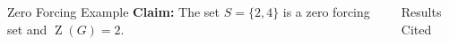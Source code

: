 \documentclass[final]{beamer}
\newcommand{\Z}{\operatorname{Z}}
\newcommand{\A}{\mathcal{A}}
\newcommand{\B}{\mathcal{B}}
\newcommand{\x}{\times}
\newcommand{\eit}{\end{itemize}}
\newcommand{\ben}{\begin{enumerate}}
\newcommand{\een}{\end{enumerate}}
\def\mtx#1{\begin{bmatrix} #1 \end{bmatrix}}
\begin{document}
\begin{frame}{}
\begin{columns}[t]
\begin{column}{0.23\linewidth}

\begin{block}{Zero Forcing Example}
\textbf{Claim:} The set $S = \{2,4\}$ is a zero forcing set and $\Z(G) = 2$.
\begin{figure}[h!]
\centering
{}
\end{figure}

\end{block}

\end{column}%

\begin{column}{0.38\linewidth}
 

\begin{block}{Results Cited}
     

\end{block}
\end{column}
\end{columns}
\end{frame}
\end{document}
